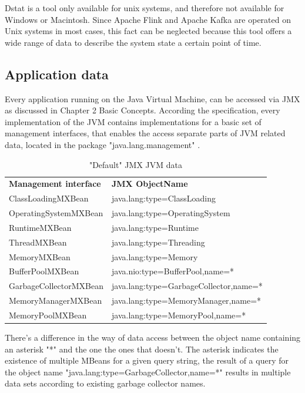 Dstat is a tool only available for unix systems, and therefore not available for Windows or
Macintosh. Since Apache Flink and Apache Kafka are operated on Unix systems in most
cases, this fact can be neglected because this tool offers a wide range of data to describe
the system state a certain point of time.

\subsection{Application data}

Every application running on the Java Virtual Machine, can be accessed via JMX as discussed
in Chapter 2 Basic Concepts. According the specification, every implementation of the JVM contains
implementations for a basic set of management interfaces, that enables the access separate parts of JVM related data,
located in the package "java.lang.management" \cite{Javadoc16}.

\begin{table}[H]
    \begin{tabular}{ll}
        \textbf{Management interface} & \textbf{JMX ObjectName} \\
        ClassLoadingMXBean & java.lang:type=ClassLoading \\
        OperatingSystemMXBean & java.lang:type=OperatingSystem \\
        RuntimeMXBean & java.lang:type=Runtime \\
        ThreadMXBean & java.lang:type=Threading \\
        MemoryMXBean & java.lang:type=Memory \\
        BufferPoolMXBean & java.nio:type=BufferPool,name=* \\
        GarbageCollectorMXBean & java.lang:type=GarbageCollector,name=* \\
        MemoryManagerMXBean & java.lang:type=MemoryManager,name=* \\
        MemoryPoolMXBean & java.lang:type=MemoryPool,name=* \\
    \end{tabular}
    \caption{"Default" JMX JVM data}
    \label{tbl:jmxjvmdata}
\end{table}

There's a difference in the way of data access between the object name containing an asterisk "*"
and the one the ones that doesn't. The asterisk indicates the existence of multiple MBeans for a given query string,
the result of a query for the object name "java.lang:type=GarbageCollector,name=*" results in multiple data sets according
to existing garbage collector names.

